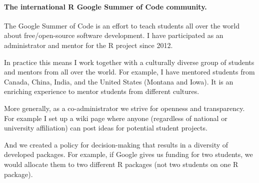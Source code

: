 \documentclass{article}
\begin{document}
\paragraph{The international R Google Summer of Code community.}
The Google Summer of Code is an effort to teach students all over the world about free/open-source software development. I have participated as an administrator and mentor for the R project since 2012.

In practice this means I work together with a culturally diverse group of students and mentors from all over the world. For example, I have mentored students from Canada, China, India, and the United States (Montana and Iowa). It is an enriching experience to mentor students from different cultures.

More generally, as a co-administrator we strive for openness and transparency. For example I set up a wiki page where anyone (regardless of national or university affiliation) can post ideas for potential student projects.

And we created a policy for decision-making that results in a diversity of developed packages. For example, if Google gives us funding for two students, we would allocate them to two different R packages (not two students on one R package).
\end{document}
